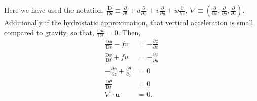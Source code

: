 \linebreak
Here we have used the notation,
$\frac{\mathrm{D}}{\mathrm{D}t} \equiv \frac{\partial}{\partial t} + u\frac{\partial}{\partial x} + v\frac{\partial}{\partial y} + w\frac{\partial}{\partial z}, \ \nabla \equiv \left(\frac{\partial}{\partial x}, \frac{\partial}{\partial y},\frac{\partial}{\partial z}\right)$. \\
\linebreak
Additionally if the hydrostatic approximation, that vertical acceleration is small compared to gravity, so that, $\frac{\mathrm{D}w}{\mathrm{D}t} = 0$. Then, 
\begin{equation}
	\begin{aligned}
	\frac{\mathrm{D}u}{\mathrm{D}t}	- fv  &= -\frac{\partial \phi}{\partial x}\\
	\frac{\mathrm{D}v}{\mathrm{D}t}	+ fu  &= -\frac{\partial \phi}{\partial y}\\
	-\frac{\partial \phi}{\partial z} + \frac{g\theta}{\theta_0} &= 0\\
	\frac{\mathrm{D} \theta}{\mathrm{D}t} &= 0\\
	\nabla \cdot \bm{u} &= 0.
	\end{aligned}
	\label{3DBousPThydro}
\end{equation}
